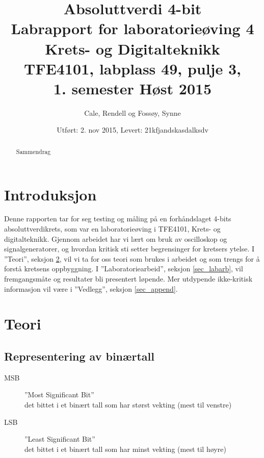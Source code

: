 \documentclass[11pt, a4paper, norwegian]{article}
\title{
	Absoluttverdi 4-bit \\
    \large Labrapport for laboratorieøving 4 \endgraf\bigskip
	Krets- og Digitalteknikk \\
    \small TFE4101, labplass 49, pulje 3, \\ 
    1. semester Høst 2015
    }
\author{Cale, Rendell og Fossøy, Synne}
\date{Utført: 2. nov 2015, Levert: 21kfjandskasdalksdv}
\begin{document}
 \maketitle
 \newpage
 
\begin{abstract}
Sammendrag
\end{abstract}
 
 \newpage
 \tableofcontents
 \newpage
 
 
 
 
 
 
 
 
 
\section{Introduksjon}
Denne rapporten tar for seg testing og måling på en forhåndslaget 4-bits absoluttverdikrets, som var en laboratorieøving i TFE4101, Krets- og digitalteknikk. Gjennom arbeidet har vi lært om bruk av oscilloskop og signalgeneratorer, og hvordan kritisk sti setter begrensinger for kretsers ytelse. 
I ''Teori'', seksjon \ref{sec_teori}, vil vi ta for oss teori som brukes i arbeidet og som trengs for å forstå kretsens oppbyggning. I ''Laboratoriearbeid'', seksjon \ref{sec_labarb}, vil fremgangsmåte og resultater bli presentert løpende. Mer utdypende ikke-kritisk informasjon vil være i ''Vedlegg'', seksjon \ref{sec_append}. 



\section{Teori} \label{sec_teori}
\subsection{Representering av binærtall}


\begin{description}
\item[MSB]{''Most Significant Bit'' \\
det bittet i et binært tall som har størst vekting (mest til venstre)}
\item[LSB]{''Least Significant Bit'' \\
det bittet i et binært tall som har minst vekting (mest til høyre)}
\end{description}
\end{document}
